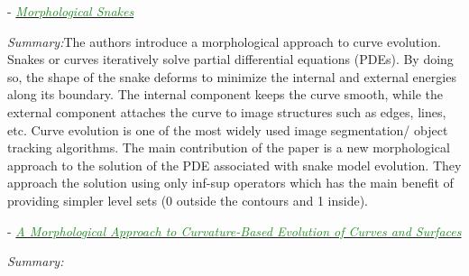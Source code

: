 \documentclass[]{article}
\newcommand{\paperentry}[4]{
            \hangindent=1cm
            \cite{#1} - \href{run:../References/#3}{\textcolor{ForestGreen}{\textit{#2}}}
            
            \noindent            
            \begin{minipage}[t]{0.1\linewidth}\hfill\end{minipage}
            \begin{minipage}[t]{0.8\linewidth}\textcolor{NavyBlue}{{\textit{Summary:}}}#4\end{minipage}
            \vspace{.25cm}
          }
\begin{document}
	\paperentry{Alvarez2010MorphologicalSnakes}
	{Morphological Snakes}
	{Segmentation/Alvarez2010MorphologicalSnakes.pdf}
	{The authors introduce a morphological approach to curve evolution.  Snakes or curves iteratively solve partial differential equations (PDEs).  By doing so, the shape of the snake deforms to minimize the internal and external energies along its boundary.  The internal component keeps the curve smooth, while the external component attaches the curve to image structures such as edges, lines, etc.  Curve evolution is one of the most widely used image segmentation/ object tracking algorithms.  The main contribution of the paper is a new morphological approach to the solution of the PDE associated with snake model evolution.  They approach the solution using only inf-sup operators which has the main benefit of providing simpler level sets (0 outside the contours and 1 inside).}
	
	\paperentry{Marquez_Neila2014MorphologicalCurveBasedEvolution}
	{A Morphological Approach to Curvature-Based Evolution of Curves and Surfaces}
	{Segmentation/Marquez_Neila2014MorphologicalCurveBasedEvolution.pdf}
	{}

\newpage



\end{document}
